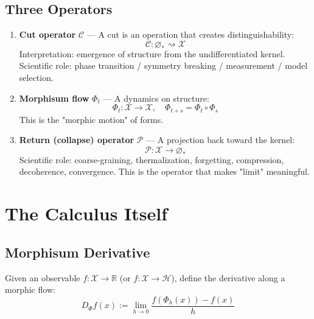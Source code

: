 \documentclass[12pt, oneside]{article}
\begin{document}
\subsection{Three Operators}

\begin{enumerate}
    \item \textbf{Cut operator} $\mathcal{C}$ — A cut is an operation that creates distinguishability:
    \begin{equation}
    \mathcal{C}: \varnothing_* \rightsquigarrow \mathcal{X}
    \end{equation}
    Interpretation: emergence of structure from the undifferentiated kernel. Scientific role: phase transition / symmetry breaking / measurement / model selection.
    
    \item \textbf{Morphisum flow} $\Phi_t$ — A dynamics on structure:
    \begin{equation}
    \Phi_t: \mathcal{X} \rightarrow \mathcal{X}, \quad \Phi_{t+s} = \Phi_t \circ \Phi_s
    \end{equation}
    This is the "morphic motion" of forms.
    
    \item \textbf{Return (collapse) operator} $\mathcal{P}$ — A projection back toward the kernel:
    \begin{equation}
    \mathcal{P}: \mathcal{X} \rightarrow \varnothing_*
    \end{equation}
    Scientific role: coarse-graining, thermalization, forgetting, compression, decoherence, convergence. This is the operator that makes "limit" meaningful.
\end{enumerate}

\section{The Calculus Itself}

\subsection{Morphisum Derivative}

Given an observable $f: \mathcal{X} \rightarrow \mathbb{R}$ (or $f: \mathcal{X} \rightarrow \mathcal{H}$), define the derivative along a morphic flow:
\begin{equation}
D_{\Phi}f(x) := \lim_{h \to 0} \frac{f(\Phi_h(x)) - f(x)}{h}
\end{equation}
\end{document}
